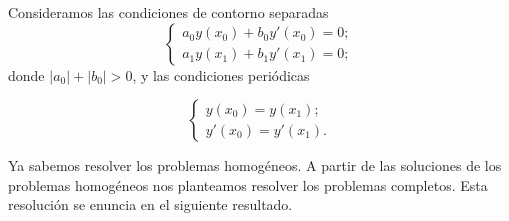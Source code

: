 \documentclass{article}
\begin{document}
Consideramos las condiciones de contorno separadas
\begin{equation}
  \label{eq:sturm:sep}
  \begin{cases}
    a_0 y(x_0) + b_0 y'(x_0) = 0; \\ a_1 y(x_1) + b_1 y'(x_1) = 0;
  \end{cases}
\end{equation}
donde $|a_0| + |b_0| > 0$, y las condiciones periódicas

\begin{equation}
  \label{eq:sturm:ped}
  \begin{cases}
    y(x_0) = y(x_1); \\ y'(x_0) = y'(x_1).
  \end{cases}
\end{equation}

Ya sabemos resolver los problemas homogéneos. A partir de las soluciones de los problemas homogéneos
nos planteamos resolver los problemas completos. Esta resolución se enuncia en el siguiente
resultado.
\end{document}
